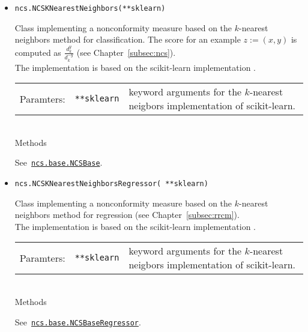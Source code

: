 \documentclass[twoside,11pt]{article}
\def\wo{~\\}
\begin{document}
\begin{appendices}
\begin{itemize}
        \item
          \texttt{ncs.NCSKNearestNeighbors(**sklearn)}

          Class implementing a nonconformity measure based
          on the $k$-nearest neighbors method for
          classification.
          The score for an example $z := (x,y)$ is computed
          as $\frac{d^{y}_k}{d^{-y}_k}$
          (see Chapter~\ref{subsec:ncs}).
          \\

          The implementation is based on the scikit-learn
          implementation \citep[see][]{sklearn_api}.
          \\

          \begin{tabu}{llX}
            Paramters: &\texttt{**sklearn}
                       &keyword arguments for the
                        $k$-nearest neigbors implementation
                        of scikit-learn.
          \end{tabu}
          \wo

          Methods

          See~\hyperref[itm:ncsbase]
          {\texttt{ncs.base.NCSBase}}.
          \\


        \item
          \texttt{ncs.NCSKNearestNeighborsRegressor(%
                  **sklearn)}

          Class implementing a nonconformity measure based
          on the $k$-nearest neighbors method for
          regression (see Chapter~\ref{subsec:rrcm}).
          \\

          The implementation is based on the scikit-learn
          implementation \citep[see][]{sklearn_api}.
          \\

          \begin{tabu}{llX}
            Paramters: &\texttt{**sklearn}
                       &keyword arguments for the
                        $k$-nearest neigbors implementation
                        of scikit-learn.
          \end{tabu}
          \wo

          Methods

          See~\hyperref[itm:ncsbaseregressor]
          {\texttt{ncs.base.NCSBaseRegressor}}.
          \\


\end{itemize}
\end{appendices}
\end{document}
